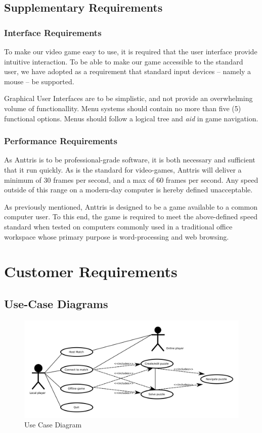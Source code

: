 \documentclass[12pt]{article}
\begin{document}
\subsection{Supplementary Requirements}\label{supplementary-reqs-SM}
\subsubsection{Interface Requirements}
To make our video game easy to use, it is required that the user interface
provide intuitive interaction. To be able to make our game accessible to
the standard user, we have adopted as a requirement that standard
input devices -- namely a mouse -- be supported.

Graphical User Interfaces are to be simplistic, and not provide an overwhelming
volume of functionallity. Menu systems should contain no more than five (5)
functional options. Menus should follow a logical tree and \textsl{aid} in
game navigation.
\subsubsection{Performance Requirements}
As Anttris is to be professional-grade software, it is both necessary and
sufficient that it run quickly. As is the standard for video-games, Anttris
will deliver a minimum of 30 frames per second, and a max of 60 frames per
second. Any speed outside of this range on a modern-day computer is hereby
defined unacceptable.

As previously mentioned, Anttris is designed to be a game available to a common
computer user. To this end, the game is required to meet the above-defined
speed standard when tested on computers commonly used in a traditional office
workspace whose primary purpose is word-processing and web browsing.

\section{Customer Requirements}\label{cust-reqs-HR}
\subsection{Use-Case Diagrams}
    \begin{figure}[H]
        \centering
        \includegraphics[width=6in]{use_cases.png}
        \caption{Use Case Diagram}
    \end{figure}
\end{document}
